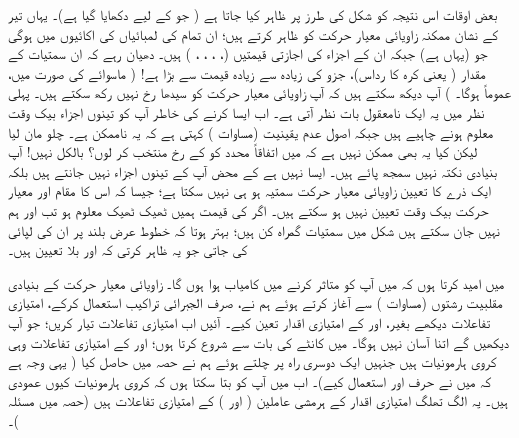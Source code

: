  بعض اوقات اس نتیجہ کو شکل  کی طرز پر ظاہر کیا جاتا ہے ( جو  کے لیے دکھایا گیا ہے)۔ یہاں تیر کے نشان ممکنہ زاویائی معیار حرکت کو ظاہر کرتے ہیں؛ ان تمام کی لمبائیاں  کی اکائیوں میں  ہوگی جو (یہاں  ہے) جبکہ ان کے  اجزاء  کی اجازتی قیمتیں (، ، ، ، ) ہیں۔ دھیان رہے کہ ان سمتیات کے مقدار ( یعنی کرہ کا رداس)،  جزو کی زیادہ سے زیادہ قیمت سے بڑا ہے! ( ماسوائے  کی صورت میں، عموماً  ہوگا۔ ) آپ دیکھ سکتے ہیں کہ آپ زاویائی معیار حرکت کو سیدھا  رخ نہیں رکھ سکتے ہیں۔ پہلی نظر میں یہ ایک نامعقول بات نظر آتی ہے۔ اب ایسا کرنے کی خاطر آپ کو تینوں اجزاء بیک وقت معلوم ہونے چاہیے ہیں جبکہ اصول عدم یقینیت (مساوات ) کہتی ہے کہ یہ ناممکن ہے۔ چلو مان لیا لیکن کیا یہ بھی ممکن نہیں ہے کہ میں اتفاقاً  محدد کو  کے رخ منتخب کر لوں؟ بالکل نہیں! آپ بنیادی نکتہ نہیں سمجھ پائے ہیں۔ ایسا نہیں ہے کے محض آپ  کے تینوں اجزاء نہیں جانتے ہیں بلکہ ایک ذرے کا تعیین زاویائی معیار حرکت سمتیہ ہو ہی نہیں سکتا ہے؛ جیسا کہ اس کا مقام اور معیار حرکت بیک وقت تعیین نہیں ہو سکتے ہیں۔ اگر  کی قیمت ہمیں ٹھیک ٹھیک معلوم ہو تب  اور  ہم نہیں جان سکتے ہیں شکل  میں سمتیات گمراہ کن ہیں؛ بہتر ہوتا کہ خطوط عرض بلند پر ان کی لپائی کی جاتی جو یہ ظاہر کرتی کہ  اور  بلا تعیین ہیں۔

 میں امید کرتا ہوں کہ میں آپ کو متاثر کرنے میں کامیاب ہوا ہوں گا۔ زاویائی معیار حرکت کے بنیادی مقلبیت رشتوں (مساوات ) سے آغاز کرتے ہوئے ہم نے، صرف الجبرائی تراکیب استعمال کرکے، امتیازی تفاعلات دیکھے بغیر،  اور  کے امتیازی اقدار تعین کیے۔ آئیں اب امتیازی تفاعلات تیار کریں؛ جو آپ دیکھیں گے اتنا آسان نہیں ہوگا۔ میں کانٹے کی بات  سے شروع کرتا ہوں؛  اور  کے امتیازی تفاعلات وہی کروی ہارمونیات ہیں جنہیں ایک دوسری راہ پر چلتے ہوئے ہم نے حصہ  میں حاصل کیا ( یہی وجہ ہے کہ میں نے حرف  اور  استعمال کیے)۔ اب میں آپ کو بتا سکتا ہوں کہ کروی ہارمونیات کیوں عمودی ہیں۔ یہ الگ تھلگ امتیازی اقدار کے ہرمشی عاملین (  اور ) کے امتیازی تفاعلات ہیں (حصہ  میں مسئلہ )۔ 

